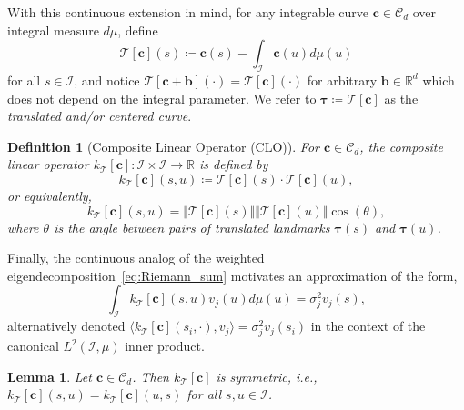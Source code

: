 \documentclass[pdflatex,iicol]{sn-jnl}%
\theoremstyle{thmstyleone}%
\newtheorem{lemma}{Lemma}%
\theoremstyle{thmstyletwo}%
\theoremstyle{thmstylethree}%
\newtheorem{definition}{Definition}%
\begin{document}
With this continuous extension in mind, for any integrable curve $\boldsymbol{c} \in \mathcal{C}_d$ over integral measure $d\mu$, define 
\begin{equation}
    \mathcal{T}[\boldsymbol{c}](s) \coloneqq \boldsymbol{c}(s) - \int_{\mathcal{I}} \boldsymbol{c}(u)d\mu(u)
\end{equation} 
for all $s \in \mathcal{I}$, and notice $\mathcal{T}[\boldsymbol{c} +\boldsymbol{b}](\cdot) = \mathcal{T}[\boldsymbol{c}](\cdot)$ for arbitrary $\boldsymbol{b}\in \mathbb{R}^d$ which does not depend on the integral parameter. We refer to $\boldsymbol{\tau} \coloneqq \mathcal{T}[\boldsymbol{c}]$ as the \textit{translated and/or centered curve}.

\begin{definition}[Composite Linear Operator (CLO)] \label{def:CLO}
    For $\boldsymbol{c} \in \mathcal{C}_d$, the \emph{composite linear operator} $k_{\mathcal{T}}[\boldsymbol{c}]:\mathcal{I}\times\mathcal{I}\to\mathbb{R}$ is defined by
    \begin{equation}\label{eq:CLO}
        k_{\mathcal{T}}[\boldsymbol{c}](s,u) \coloneqq \mathcal{T}[\boldsymbol{c}](s) \cdot \mathcal{T}[\boldsymbol{c}](u),
    \end{equation}
    or equivalently,
    \begin{equation} \label{eq:inner_prod_ident}
        k_{\mathcal{T}}[\boldsymbol{c}](s,u) = \Vert \mathcal{T}[\boldsymbol{c}](s) \Vert \Vert \mathcal{T}[\boldsymbol{c}](u) \Vert \cos{(\theta)},
    \end{equation}
    where $\theta$ is the angle between pairs of translated landmarks $\boldsymbol{\tau}(s)$ and $\boldsymbol{\tau}(u)$.
\end{definition} Finally, the continuous analog of the weighted eigendecomposition~\eqref{eq:Riemann_sum} motivates an approximation of the form,
\begin{equation} \label{eq:FIE}
    \int_{\mathcal{I}}k_{\mathcal{T}}[\boldsymbol{c}](s,u)v_j(u)d\mu(u) = \sigma_j^2v_j(s),
\end{equation}
alternatively denoted $\langle k_{\mathcal{T}}[\boldsymbol{c}](s_i,\cdot), v_j\rangle = \sigma_j^2v_j(s_i)$ in the context of the canonical $L^2(\mathcal{I},\mu)$ inner product.

\begin{lemma} \label{lemma:symm}
    Let $\boldsymbol{c} \in \mathcal{C}_d$. Then $k_{\mathcal{T}}[\boldsymbol{c}]$ is symmetric, i.e., $k_{\mathcal{T}}[\boldsymbol{c}](s,u) = k_{\mathcal{T}}[\boldsymbol{c}](u,s)$ for all $s,u \in \mathcal{I}$.
\end{lemma}
\end{document}
